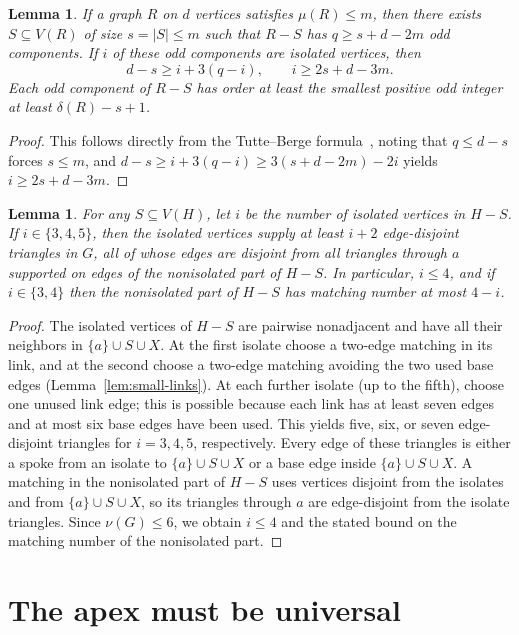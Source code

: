 \documentclass[11pt]{article}
\newtheorem{lemma}[theorem]{Lemma}
\begin{document}
\begin{lemma}\label{lem:tb}
If a graph $R$ on $d$ vertices satisfies $\mu(R)\leq m$, then there exists $S\subseteq V(R)$ of size $s=|S|\leq m$ such that $R-S$ has $q\geq s+d-2m$ odd components. If $i$ of these odd components are isolated vertices, then
\[
d-s\geq i+3(q-i), \qquad i\geq 2s+d-3m.
\]
Each odd component of $R-S$ has order at least the smallest positive odd integer at least $\delta(R)-s+1$.
\end{lemma}

\begin{proof}
This follows directly from the Tutte--Berge formula~\cite{Schrijver}, noting that $q\leq d-s$ forces $s\leq m$, and $d-s\geq i+3(q-i)\geq 3(s+d-2m)-2i$ yields $i\geq 2s+d-3m$.
\end{proof}

\begin{lemma}\label{lem:isolates}
For any $S\subseteq V(H)$, let $i$ be the number of isolated vertices in $H-S$. If $i\in\{3,4,5\}$, then the isolated vertices supply at least $i+2$ edge-disjoint triangles in $G$, all of whose edges are disjoint from all triangles through $a$ supported on edges of the nonisolated part of $H-S$. In particular, $i\leq 4$, and if $i\in\{3,4\}$ then the nonisolated part of $H-S$ has matching number at most $4-i$.
\end{lemma}

\begin{proof}
The isolated vertices of $H-S$ are pairwise nonadjacent and have all their neighbors in $\{a\}\cup S\cup X$. At the first isolate choose a two-edge matching in its link, and at the second choose a two-edge matching avoiding the two used base edges (Lemma~\ref{lem:small-links}). At each further isolate (up to the fifth), choose one unused link edge; this is possible because each link has at least seven edges and at most six base edges have been used. This yields five, six, or seven edge-disjoint triangles for $i=3,4,5$, respectively. Every edge of these triangles is either a spoke from an isolate to $\{a\}\cup S\cup X$ or a base edge inside $\{a\}\cup S\cup X$. A matching in the nonisolated part of $H-S$ uses vertices disjoint from the isolates and from $\{a\}\cup S\cup X$, so its triangles through $a$ are edge-disjoint from the isolate triangles. Since $\nu(G)\leq 6$, we obtain $i\leq 4$ and the stated bound on the matching number of the nonisolated part.
\end{proof}

\section{The apex must be universal}
\end{document}
